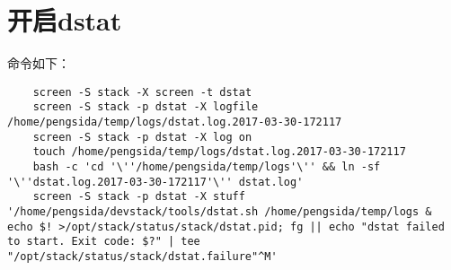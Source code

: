 \documentclass[a4paper,left=1.5cm,right=1.5cm,11pt]{article}
\begin{document}
\tableofcontents

\clearpage

\section{开启dstat}
	命令如下：
	\begin{lstlisting}
	screen -S stack -X screen -t dstat
	screen -S stack -p dstat -X logfile /home/pengsida/temp/logs/dstat.log.2017-03-30-172117
	screen -S stack -p dstat -X log on
	touch /home/pengsida/temp/logs/dstat.log.2017-03-30-172117
	bash -c 'cd '\''/home/pengsida/temp/logs'\'' && ln -sf '\''dstat.log.2017-03-30-172117'\'' dstat.log'
	screen -S stack -p dstat -X stuff '/home/pengsida/devstack/tools/dstat.sh /home/pengsida/temp/logs & echo $! >/opt/stack/status/stack/dstat.pid; fg || echo "dstat failed to start. Exit code: $?" | tee "/opt/stack/status/stack/dstat.failure"^M'
	\end{lstlisting}
\end{document}
